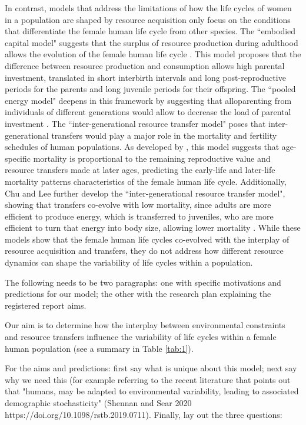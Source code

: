 \documentclass{article}
\begin{document}
In contrast, models that address the limitations of how the life cycles of women in a population are shaped by resource acquisition only focus on the conditions that differentiate the female human life cycle from other species. The ``embodied capital model" suggests that the surplus of resource production during adulthood allows the evolution of the female human life cycle \citep{kaplan2000theory}. This model proposes that the difference between resource production and consumption allows high parental investment, translated in short interbirth intervals and long post-reproductive periods for the parents and long juvenile periods for their offspring. The ``pooled energy model" deepens in this framework by suggesting that alloparenting from individuals of different generations would allow to decrease the load of parental investment \citep{kramer2010pooled}. The ``inter-generational resource transfer model" poses that inter-generational transfers would play a major role in the mortality and fertility schedules of human populations. As developed by \cite{lee2003rethinking}, this model suggests that age-specific mortality is proportional to the remaining reproductive value and resource transfers made at later ages, predicting the early-life and later-life mortality patterns characteristics of the female human life cycle. Additionally, Chu and Lee further develop the ``inter-generational resource transfer model", showing that transfers co-evolve with low mortality, since adults are more efficient to produce energy, which is transferred to juveniles, who are more efficient to turn that energy into body size, allowing lower mortality \citep{chu2006co}. While these models show that the female human life cycles co-evolved with the interplay of resource acquisition and transfers, they do not address how different resource dynamics can shape the variability of life cycles within a population.

The following needs to be two paragraphs: one with specific motivations and predictions for our model; the other with the research plan explaining the registered report aims.

Our aim is to determine how the interplay between environmental constraints and resource transfers influence the variability of life cycles within a female human population (see a summary in Table \ref{tab:1}). 

For the aims and predictions: first say what is unique about this model; next say why we need this (for example referring to the recent literature that points out that "humans, may be adapted to environmental variability, leading to associated demographic stochasticity" (Shennan and Sear 2020 https://doi.org/10.1098/rstb.2019.0711). Finally, lay out the three questions: 
\end{document}
